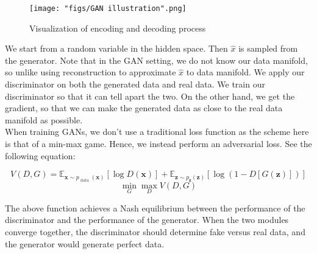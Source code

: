 \begin{figure}
    \centering
    \texttt{[image: "figs/GAN illustration".png]}
    \caption{Visualization of encoding and decoding process}
    \label{fig:enc_dec_process}
\end{figure}

We start from a random variable in the hidden space. Then $\hat{x}$ is sampled from the generator. Note that in the GAN setting, we do not know our data manifold, so unlike using reconstruction to approximate $\hat{x}$ to data manifold. We apply our discriminator on both the generated data and real data. We train our discriminator so that it can tell apart the two. On the other hand, we get the gradient, so that we can make the generated data as close to the real data manifold as possible. \\

When training GANs, we don't use a traditional loss function as the scheme here is that of a min-max game. Hence, we instead perform an adversarial loss. See the following equation:

$$V(D, G)=\mathbb{E}_{\boldsymbol{x} \sim p_{\text { data }}(\boldsymbol{x})}[\log D(\boldsymbol{x})]+\mathbb{E}_{\boldsymbol{z} \sim p_{\boldsymbol{z}}(\boldsymbol{z})}[\log (1-D[G(\boldsymbol{z})])]$$
$$\min _{G} \max _{D} V(D, G)$$

The above function achieves a Nash equilibrium between the performance of the discriminator and the performance of the generator. When the two modules converge together, the discriminator should determine fake versus real data, and the generator would generate perfect data.
